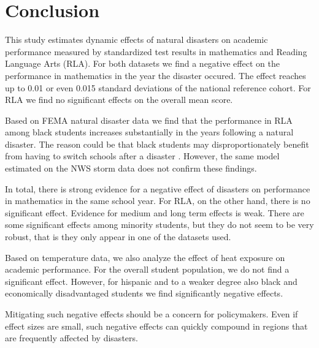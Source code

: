 \section{Conclusion} \label{Conclusion}

This study estimates dynamic effects of natural disasters on academic performance measured by standardized test results in mathematics and Reading Language Arts (RLA). For both datasets we find a negative effect on the performance in mathematics in the year the disaster occured. The effect reaches up to 0.01 or even 0.015 standard deviations of the national reference cohort. For RLA we find no significant effects on the overall mean score.

Based on FEMA natural disaster data we find that the performance in RLA among black students increases substantially in the years following a natural disaster. The reason could be that black students may disproportionately benefit from having to switch schools after a disaster \citep{Sacerdote_2012}. However, the same model estimated on the NWS storm data does not confirm these findings.

In total, there is strong evidence for a negative effect of disasters on performance in mathematics in the same school year. For RLA, on the other hand, there is no significant effect. Evidence for medium and long term effects is weak.  There are some significant effects among minority students, but they do not seem to be very robust, that is they only appear in one of the datasets used.

Based on temperature data, we also analyze the effect of heat exposure on academic performance. For the overall student population, we do not find a significant effect. However, for hispanic and to a weaker degree also black and economically disadvantaged students we find significantly negative effects.

Mitigating such negative effects should be a concern for policymakers. Even if effect sizes are small, such negative effects can quickly compound in regions that are frequently affected by disasters. 




